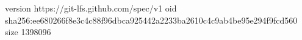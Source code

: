 version https://git-lfs.github.com/spec/v1
oid sha256:ee680266f8e3c4c88f96dbca925442a2233ba2610c4c9ab4be95e294f9fcd560
size 1398096
